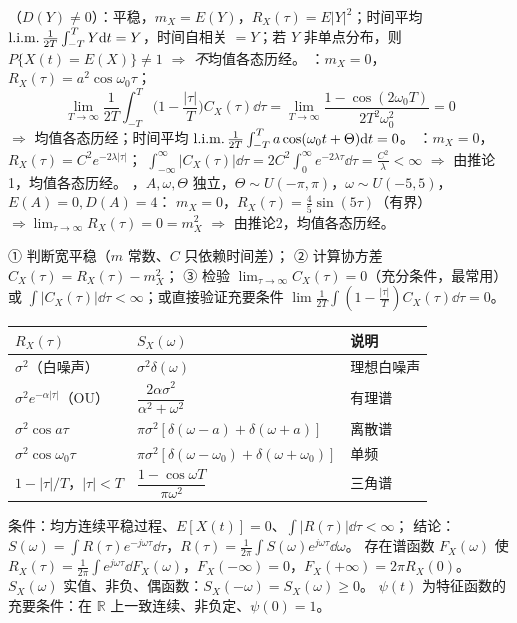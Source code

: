 \documentclass[UTF8,12pt,a4paper]{ctexart}
\begin{document}
（$D(Y)\ne0$）：平稳，$m_X=E(Y)$，$R_X(\tau)=E|Y|^2$；时间平均 $\mathop{\mathrm{l.i.m.}}\frac1{2T}\int_{-T}^TY\mathrm{d} t=Y$，时间自相关 $=Y$；若 $Y$ 非单点分布，则 $P\{X(t)=E(X)\}\ne1$ $\Rightarrow$ \emph{不}均值各态历经。
：$m_X=0$，$R_X(\tau)=a^2\cos\omega_0\tau$；
$$\lim_{T\to\infty}\frac1{2T}\int_{-T}^{T}\Big(1-\frac{|\tau|}{T}\Big)C_X(\tau)\dd\tau=\lim_{T\to\infty}\frac{1-\cos(2\omega_0T)}{2T^2\omega_0^2}=0$$
$\Rightarrow$ 均值各态历经；时间平均 $\mathop{\mathrm{l.i.m.}}\frac1{2T}\int_{-T}^Ta\cos(\omega_0t+\Theta)\mathrm{d} t=0$。
：$m_X=0$，$R_X(\tau)=C^2e^{-2\lambda|\tau|}$；
$\int_{-\infty}^{\infty}|C_X(\tau)|\dd\tau=2C^2\int_0^\infty e^{-2\lambda\tau}\dd\tau=\frac{C^2}{\lambda}<\infty$
$\Rightarrow$ 由推论1，均值各态历经。
，$A,\omega,\Theta$ 独立，$\Theta\sim U(-\pi,\pi)$，$\omega\sim U(-5,5)$，$E(A)=0,D(A)=4$：
$m_X=0$，$R_X(\tau)=\frac45\sin(5\tau)$（有界）$\Rightarrow\lim_{\tau\to\infty}R_X(\tau)=0=m_X^2$ $\Rightarrow$ 由推论2，均值各态历经。

① 判断宽平稳（$m$ 常数、$C$ 只依赖时间差）；
② 计算协方差 $C_X(\tau)=R_X(\tau)-m_X^2$；
③ 检验 $\lim_{\tau\to\infty}C_X(\tau)=0$（充分条件，最常用）或 $\int|C_X(\tau)|\dd\tau<\infty$；或直接验证充要条件 $\lim\frac1{2T}\int(1-\frac{|\tau|}{T})C_X(\tau)\dd\tau=0$。

\begin{center}\footnotesize
\begin{tabular}{p{2.80cm}p{3.16cm}p{2.68cm}}\hline
$R_X(\tau)$ & $S_X(\omega)$ & 说明\\\hline
$\sigma^2$（白噪声） & $\sigma^2\delta(\omega)$ & 理想白噪声\\
$\sigma^2e^{-\alpha|\tau|}$（OU） & $\dfrac{2\alpha\sigma^2}{\alpha^2+\omega^2}$ & 有理谱\\
$\sigma^2\cos a\tau$ & $\pi\sigma^2[\delta(\omega-a)+\delta(\omega+a)]$ & 离散谱\\
$\sigma^2\cos\omega_0\tau$ & $\pi\sigma^2[\delta(\omega-\omega_0)+\delta(\omega+\omega_0)]$ & 单频\\
$1-|\tau|/T$，$|\tau|<T$ & $\dfrac{1-\cos\omega T}{\pi\omega^2}$ & 三角谱\\\hline
\end{tabular}\end{center}
 条件：均方连续平稳过程、$E[X(t)]=0$、$\int|R(\tau)|\dd\tau<\infty$；
结论：$S(\omega)=\int R(\tau)e^{-j\omega\tau}\dd\tau$，$R(\tau)=\frac1{2\pi}\int S(\omega)e^{j\omega\tau}\dd\omega$。
 存在谱函数 $F_X(\omega)$ 使 $R_X(\tau)=\frac1{2\pi}\int e^{j\omega\tau}\dd F_X(\omega)$，$F_X(-\infty)=0$，$F_X(+\infty)=2\pi R_X(0)$。
 $S_X(\omega)$ 实值、非负、偶函数：$S_X(-\omega)=S_X(\omega)\ge0$。
 $\psi(t)$ 为特征函数的充要条件：在 $\mathbb R$ 上一致连续、非负定、$\psi(0)=1$。
\end{document}
